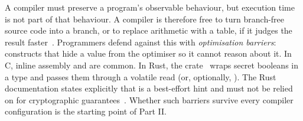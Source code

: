 A compiler must preserve a program's observable behaviour, but execution time is not part of that behaviour. A compiler is therefore free to turn branch-free source code into a branch, or to replace arithmetic with a table, if it judges the result faster~\cite{tobrust}. Programmers defend against this with \emph{optimisation barriers}: constructs that hide a value from the optimiser so it cannot reason about it. In C, inline assembly and  are common. In Rust, the  crate~\cite{subtle} wraps secret booleans in a  type and passes them through a volatile read (or, optionally, ). The Rust documentation states explicitly that  is a best-effort hint and must not be relied on for cryptographic guarantees~\cite{blackbox}. Whether such barriers survive every compiler configuration is the starting point of Part II.
